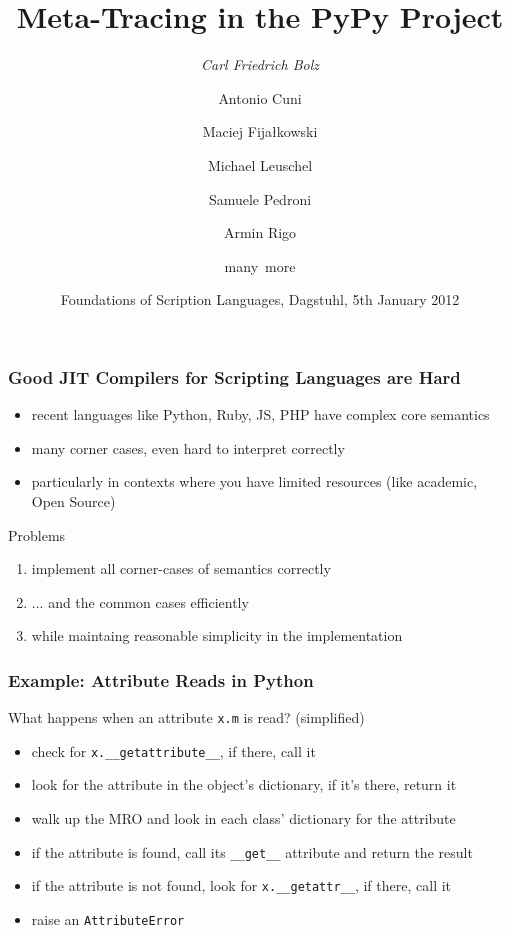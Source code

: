 \documentclass[utf8x]{beamer}
\title{Meta-Tracing in the PyPy Project}
\author[Carl Friedrich Bolz et. al.]{\emph{Carl Friedrich Bolz}\inst{1} \and Antonio Cuni\inst{1} \and Maciej Fijałkowski\inst{2} \and Michael Leuschel\inst{1} \and Samuele Pedroni\inst{3} \and Armin Rigo\inst{1} \and many~more}
\institute[Heinrich-Heine-Universität Düsseldorf]
{$^1$Heinrich-Heine-Universität Düsseldorf, STUPS Group, Germany \and

 $^2$merlinux GmbH, Hildesheim, Germany \and

 $^3$Canonical
}
\date{Foundations of Scription Languages, Dagstuhl, 5th January 2012}
\begin{document}
\begin{frame}
  \titlepage
\end{frame}

\begin{frame}
  \frametitle{Good JIT Compilers for Scripting Languages are Hard}
  \begin{itemize}
      \item recent languages like Python, Ruby, JS, PHP have complex core semantics
      \item many corner cases, even hard to interpret correctly
      \item particularly in contexts where you have limited resources (like
      academic, Open Source)
  \end{itemize}
  \pause
  \begin{block}{Problems}
      \begin{enumerate}
          \item implement all corner-cases of semantics correctly
          \item ... and the common cases efficiently
          \item while maintaing reasonable simplicity in the implementation
      \end{enumerate}
  \end{block}
\end{frame}

\begin{frame}
  \frametitle{Example: Attribute Reads in Python}
  What happens when an attribute \texttt{x.m} is read? (simplified)
  \pause
  \begin{itemize}
      \item check for \texttt{x.\_\_getattribute\_\_}, if there, call it
      \pause
      \item look for the attribute in the object's dictionary, if it's there, return it
      \pause
      \item walk up the MRO and look in each class' dictionary for the attribute
      \pause
      \item if the attribute is found, call its \texttt{\_\_get\_\_} attribute and return the result
      \pause
      \item if the attribute is not found, look for \texttt{x.\_\_getattr\_\_}, if there, call it
      \pause
      \item raise an \texttt{AttributeError}
  \end{itemize}
\end{frame}
\end{document}
